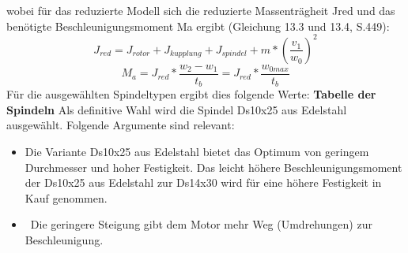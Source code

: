 wobei für das reduzierte Modell sich die reduzierte Massenträgheit Jred und das benötigte Beschleunigungsmoment Ma ergibt (Gleichung 13.3 und 13.4, S.449):
\begin{equation}
J_{red}=J_{rotor}+J_{kupplung}+J_{spindel}+m*(\frac{v_{1}}{w_{0}})^{2}
\end{equation}
\begin{equation}
M_{a}=J_{red}*\frac{w_{2}-w_{1}}{t_{b}}=J_{red}*\frac{w_{0max}}{t_{b}}
\end{equation}
Für die ausgewählten Spindeltypen ergibt dies folgende Werte:
\newline
\textbf{Tabelle der Spindeln}
\newline
\newline
Als definitive Wahl wird die Spindel Ds10x25 aus Edelstahl ausgewählt. Folgende Argumente sind relevant:
	\begin{itemize}
	\item Die Variante Ds10x25 aus Edelstahl bietet das Optimum von geringem Durchmesser und hoher Festigkeit. Das leicht höhere Beschleunigungsmoment der Ds10x25 aus Edelstahl zur Ds14x30 wird für eine höhere Festigkeit in Kauf genommen.
	
	\item \ Die geringere Steigung gibt dem Motor mehr Weg (Umdrehungen) zur Beschleunigung.
\end{itemize}